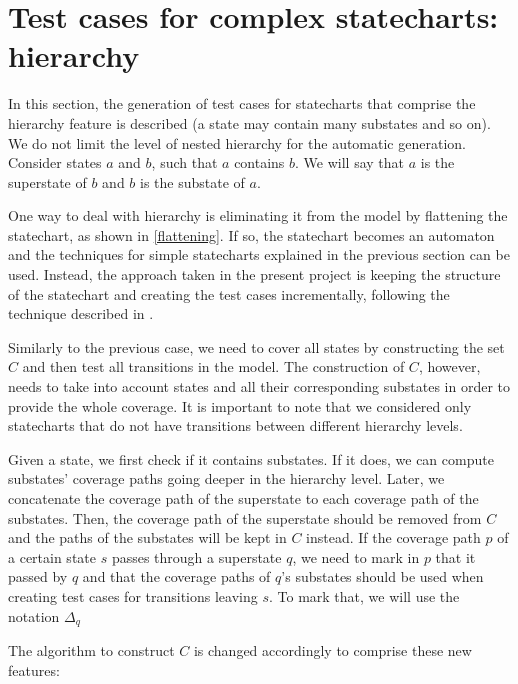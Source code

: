 \section{Test cases for complex statecharts: hierarchy}
\label{testHierarchy}

In this section, the generation of test cases for statecharts that comprise the hierarchy feature is described (a state may contain many substates and so on). We do not limit the level of nested hierarchy for the automatic generation. Consider states $a$ and $b$, such that $a$ contains $b$. We will say that $a$ is the superstate of $b$ and $b$ is the substate of $a$.

One way to deal with hierarchy is eliminating it from the model by flattening the statechart, as shown in \ref{flattening}. If so, the statechart becomes an automaton and the techniques for simple statecharts explained in the previous section can be used. Instead, the approach taken in the present project is keeping the structure of the statechart and creating the test cases incrementally, following the technique described in \cite{bogdanov}.

Similarly to the previous case, we need to cover all states by constructing the set $C$ and then test all transitions in the model. The construction of $C$, however, needs to take into account states and all their corresponding substates in order to provide the whole coverage. It is important to note that we considered only statecharts that do not have transitions between different hierarchy levels. 

Given a state, we first check if it contains substates. If it does, we can compute substates' coverage paths going deeper in the hierarchy level. Later, we concatenate the coverage path of the superstate to each coverage path of the substates. Then, the coverage path of the superstate should be removed from $C$ and the paths of the substates will be kept in $C$ instead. If the coverage path $p$ of a certain state $s$ passes through a superstate $q$, we need to mark in $p$ that it passed by $q$ and that the coverage paths of $q$'s substates should be used when creating test cases for transitions leaving $s$. To mark that, we will use the notation $\Delta_q$

The algorithm to construct $C$ is changed accordingly to comprise these new features: 

